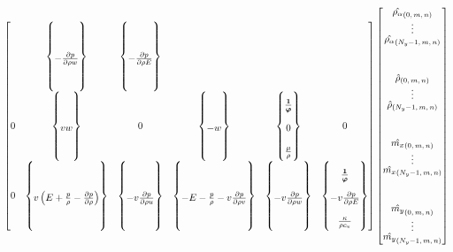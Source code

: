 \begin{sidewaysfigure}
{{\begin{minipage}[c]{\textwidth}
\begin{align*}
\begin{bmatrix}
{  }
& \entry{\my\mz  }
  \subcoeff{
  }{
 -\pp{p}{\rho w}
  }{
  }
& \entry{\my{}e  }
  \subcoeff{
  }{
 - \pp{p}{\rho E}
  }{
  }
\\\entry{\mz\rho_{\alpha} }
0
& 
\entry{\mz\rho}
  \subcoeff{
  }{
    vw
  }{
  }
& \entry{\mz\mx }
 0
& \entry{\mz\my }
  \subcoeff{
  }{
    -w
  }{
  }
& \entry{\mz\mz }
  \subcoeff{
 \bm{\frac{1}{\vp}} %
  }{
 0 
  }{
    \frac{\mu}{\rho}
  }
& \entry{\mz{}e }
 0
\\\entry{e\rho_{\alpha} }
 0 
& 
\entry{e\rho  }
  \subcoeff{
  }{
    v \left( E + \frac{p}{\rho} - \pp{p}{\rho} \right)
  }{
  }
& \entry{e\mx   }
  \subcoeff{
  }{
    -v \pp{p}{\rho u}
  }{
  }
& \entry{e\my   }
  \subcoeff{
  }{
  -E - \frac{p}{\rho} - v \pp{p}{\rho v}
  }{
  }
& \entry{e\mz   }
  \subcoeff{
  }{
 -v \pp{p}{\rho w}
  }{
  }
& \entry{ee     }
  \subcoeff{
 \bm{\frac{1}{\vp}} %
  }{
 - v \pp{p}{\rho E}
  }{
 \frac{\kappa}{\rho c_v}
  }
\end{bmatrix}
\renewcommand{\arraystretch}{0.6}
\begin{bmatrix}
  \hat{\rho_{\alpha}}_{\left(0,\,m,\,n\right)} \\
  \vdots \\
  \hat{\rho_{\alpha}}_{\left(N_y-1,\,m,\,n\right)} \\
\\%
\\%
\\%
\\%
  \hat{\rho}_{\left(0,\,m,\,n\right)} \\
  \vdots \\
  \hat{\rho}_{\left(N_y-1,\,m,\,n\right)} \\
\\%
\\%
\\%
\\%
  \hat{\mx}_{\left(0,\,m,\,n\right)} \\
  \vdots \\
  \hat{\mx}_{\left(N_y-1,\,m,\,n\right)} \\
\\%
\\%
\\%
\\%
  \hat{\my}_{\left(0,\,m,\,n\right)} \\
  \vdots \\
  \hat{\my}_{\left(N_y-1,\,m,\,n\right)} \\

\end{bmatrix}
\end{align*}
\end{minipage}}}
\end{sidewaysfigure}
